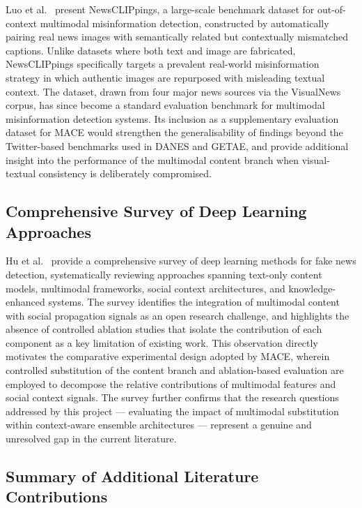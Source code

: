 Luo et al.\ \cite{Luo2021} present NewsCLIPpings, a large-scale benchmark dataset for out-of-context multimodal misinformation detection, constructed by automatically pairing real news images with semantically related but contextually mismatched captions. Unlike datasets where both text and image are fabricated, NewsCLIPpings specifically targets a prevalent real-world misinformation strategy in which authentic images are repurposed with misleading textual context. The dataset, drawn from four major news sources via the VisualNews corpus, has since become a standard evaluation benchmark for multimodal misinformation detection systems. Its inclusion as a supplementary evaluation dataset for MACE would strengthen the generalisability of findings beyond the Twitter-based benchmarks used in DANES and GETAE, and provide additional insight into the performance of the multimodal content branch when visual-textual consistency is deliberately compromised.

\subsection{Comprehensive Survey of Deep Learning Approaches}

Hu et al.\ \cite{Hu2022} provide a comprehensive survey of deep learning methods for fake news detection, systematically reviewing approaches spanning text-only content models, multimodal frameworks, social context architectures, and knowledge-enhanced systems. The survey identifies the integration of multimodal content with social propagation signals as an open research challenge, and highlights the absence of controlled ablation studies that isolate the contribution of each component as a key limitation of existing work. This observation directly motivates the comparative experimental design adopted by MACE, wherein controlled substitution of the content branch and ablation-based evaluation are employed to decompose the relative contributions of multimodal features and social context signals. The survey further confirms that the research questions addressed by this project — evaluating the impact of multimodal substitution within context-aware ensemble architectures — represent a genuine and unresolved gap in the current literature.

\subsection{Summary of Additional Literature Contributions}

